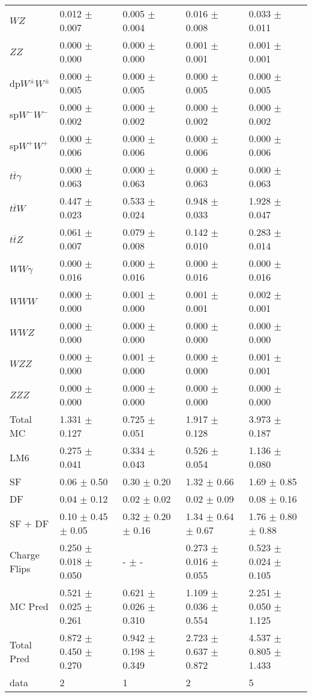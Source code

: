 \begin{tabular}{l | l l l l}
$WZ$ &  0.012 $\pm$  0.007 &  0.005 $\pm$  0.004 &  0.016 $\pm$  0.008 &  0.033 $\pm$  0.011\\
$ZZ$ &   0.000 $\pm$   0.000 &   0.000 $\pm$   0.000 &  0.001 $\pm$  0.001 &  0.001 $\pm$  0.001\\
\hline
dp$W^{\pm}W^{\pm}$ &  0.000 $\pm$  0.005 &  0.000 $\pm$  0.005 &  0.000 $\pm$  0.005 &  0.000 $\pm$  0.005\\
sp$W^{-}W^{-}$ &  0.000 $\pm$  0.002 &  0.000 $\pm$  0.002 &  0.000 $\pm$  0.002 &  0.000 $\pm$  0.002\\
sp$W^{+}W^{+}$ &  0.000 $\pm$  0.006 &  0.000 $\pm$  0.006 &  0.000 $\pm$  0.006 &  0.000 $\pm$  0.006\\
$t\overline{t}\gamma$ &  0.000 $\pm$  0.063 &  0.000 $\pm$  0.063 &  0.000 $\pm$  0.063 &  0.000 $\pm$  0.063\\
$t\overline{t}W$ &  0.447 $\pm$  0.023 &  0.533 $\pm$  0.024 &  0.948 $\pm$  0.033 &  1.928 $\pm$  0.047\\
$t\overline{t}Z$ &  0.061 $\pm$  0.007 &  0.079 $\pm$  0.008 &  0.142 $\pm$  0.010 &  0.283 $\pm$  0.014\\
$WW\gamma$ &  0.000 $\pm$  0.016 &  0.000 $\pm$  0.016 &  0.000 $\pm$  0.016 &  0.000 $\pm$  0.016\\
$WWW$ &   0.000 $\pm$   0.000 &  0.001 $\pm$   0.000 &  0.001 $\pm$  0.001 &  0.002 $\pm$  0.001\\
$WWZ$ &   0.000 $\pm$   0.000 &   0.000 $\pm$   0.000 &  0.000 $\pm$   0.000 &   0.000 $\pm$   0.000\\
$WZZ$ &   0.000 $\pm$   0.000 &  0.001 $\pm$   0.000 &   0.000 $\pm$   0.000 &  0.001 $\pm$  0.001\\
$ZZZ$ &   0.000 $\pm$   0.000 &   0.000 $\pm$   0.000 &   0.000 $\pm$   0.000 &   0.000 $\pm$   0.000\\
\hline
Total MC &  1.331 $\pm$  0.127 &  0.725 $\pm$  0.051 &  1.917 $\pm$  0.128 &  3.973 $\pm$  0.187\\
\hline\hline
\hline
LM6 &  0.275 $\pm$  0.041 &  0.334 $\pm$  0.043 &  0.526 $\pm$  0.054 &  1.136 $\pm$  0.080\\
\hline\hline
\hline\hline
 SF  & 0.06 $\pm$ 0.50 & 0.30 $\pm$ 0.20 & 1.32 $\pm$ 0.66 & 1.69 $\pm$ 0.85\\
 DF  & 0.04 $\pm$ 0.12 & 0.02 $\pm$ 0.02 & 0.02 $\pm$ 0.09 & 0.08 $\pm$ 0.16\\
\hline
 SF + DF  & 0.10 $\pm$ 0.45 $\pm$ 0.05 & 0.32 $\pm$ 0.20 $\pm$ 0.16 & 1.34 $\pm$ 0.64 $\pm$ 0.67 & 1.76 $\pm$ 0.80 $\pm$ 0.88\\
\hline\hline
Charge Flips & 0.250 $\pm$ 0.018 $\pm$ 0.050 & - $\pm$ - & 0.273 $\pm$ 0.016 $\pm$ 0.055 & 0.523 $\pm$ 0.024 $\pm$ 0.105\\
\hline\hline
\hline
MC Pred &  0.521 $\pm$  0.025 $\pm$  0.261 &  0.621 $\pm$  0.026 $\pm$  0.310 &  1.109 $\pm$  0.036 $\pm$  0.554 &  2.251 $\pm$  0.050 $\pm$  1.125\\
\hline\hline
Total Pred &  0.872 $\pm$  0.450 $\pm$  0.270 &  0.942 $\pm$  0.198 $\pm$  0.349 &  2.723 $\pm$  0.637 $\pm$  0.872 &  4.537 $\pm$  0.805 $\pm$  1.433\\
\hline\hline
data & 2 & 1 & 2 & 5\\
\hline\hline
\end{tabular}
